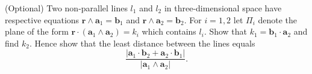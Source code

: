 \documentclass[answers]{exam}
\begin{document}
\begin{questions}



\question%
(Optional) Two non-parallel lines $l_{1}$ and $l_{2}$ in three-dimensional space have respective equations $\mathbf{r} \wedge \mathbf{a}_{1}=\mathbf{b}_{1}$ and $\mathbf{r} \wedge \mathbf{a}_{2}=\mathbf{b}_{2}$. For $i=1,2$ let $\Pi_{i}$ denote the plane of the form $\mathbf{r} \cdot\left(\mathbf{a}_{1} \wedge \mathbf{a}_{2}\right)=k_{i}$ which contains $l_{i}$. Show that $k_{1}=\mathbf{b}_{1} \cdot \mathbf{a}_{2}$ and find $k_{2}$. Hence show that the least distance between the lines equals \[
	\frac{\left|\mathbf{a}_{1} \cdot \mathbf{b}_{2}+\mathbf{a}_{2} \cdot \mathbf{b}_{1}\right|}{\left|\mathbf{a}_{1} \wedge \mathbf{a}_{2}\right|}.
\]

\end{questions}
\end{document}
